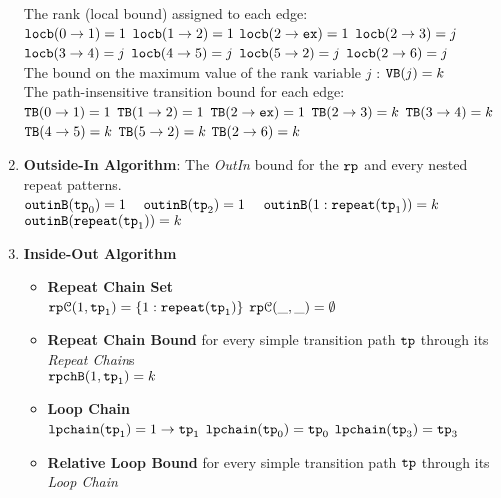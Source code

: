 \begin{enumerate}
    The rank (local bound) assigned to each edge:
      \\  
      $\mathtt{locb}(0 \to 1) = 1$ 
      \quad $\mathtt{locb}(1 \to 2) = 1$
      \quad $\mathtt{locb}(2 \to \mathtt{ex}) = 1$
      \quad $\mathtt{locb}(2 \to 3) = j$ 
      \quad $\mathtt{locb}(3 \to 4) = j$
      \quad $\mathtt{locb}(4 \to 5) = j$ 
      \quad $\mathtt{locb}(5 \to 2) = j$ 
      \quad $\mathtt{locb}(2 \to 6) = j$ 
  \\
  The bound on the maximum value of the rank variable $j$ : ${\mathtt{VB}}(j) = k$
  \\
  The path-insensitive transition bound for each edge:
  \\
  ${\mathtt{TB}}(0 \to 1) = 1$ 
  \quad ${\mathtt{TB}}(1 \to 2) = 1$
  \quad ${\mathtt{TB}}(2 \to \mathtt{ex}) = 1$ 
  \quad ${\mathtt{TB}}(2 \to 3) = k$ 
  \quad ${\mathtt{TB}}(3 \to 4) = k$
  \quad ${\mathtt{TB}}(4 \to 5) = k$ 
  \quad ${\mathtt{TB}}(5 \to 2) = k$ 
  \quad ${\mathtt{TB}}(2 \to 6) = k$ 
  \item \textbf{Outside-In Algorithm}: The \emph{OutIn} bound for the $\mathtt{rp}$ and every nested repeat patterns.
  \\
  $\mathtt{outinB}(\mathtt{tp}_0) = 1$
  ~
  $\mathtt{outinB}(\mathtt{tp}_2) = 1$
  ~
  $\mathtt{outinB}({1: \mathtt{repeat}(\mathtt{tp}_1)}) = k $
  ~
  $\mathtt{outinB}(\mathtt{repeat}(\mathtt{tp}_1)) = k $
  \item \textbf{Inside-Out Algorithm}
  \begin{itemize}
    \item \textbf{Repeat Chain Set}
    \\
    $\mathtt{rp}\mathcal{C}(1, \mathtt{tp}_1) = \{1: \mathtt{repeat}(\mathtt{tp}_1)\}$ 
    \quad
    $\mathtt{rp}\mathcal{C}(\_, \_) = \emptyset$ 
    \item \textbf{Repeat Chain Bound} for every simple transition path $\mathtt{tp}$ through its \emph{Repeat Chain}s
    \\
    $\mathtt{rpchB}(1, \mathtt{tp}_1) = k$
    \item \textbf{Loop Chain}
    \\
    $\mathtt{lpchain}(\mathtt{tp}_1) = 1\to \mathtt{tp}_1$ \quad
    $\mathtt{lpchain}(\mathtt{tp}_0) = \mathtt{tp}_0$ \quad
    $\mathtt{lpchain}(\mathtt{tp}_3) = \mathtt{tp}_3$ 
    \item \textbf{{Relative Loop Bound}} for every simple transition path $\mathtt{tp}$ through its \emph{Loop Chain}
    \\

\end{itemize}
\end{enumerate}
